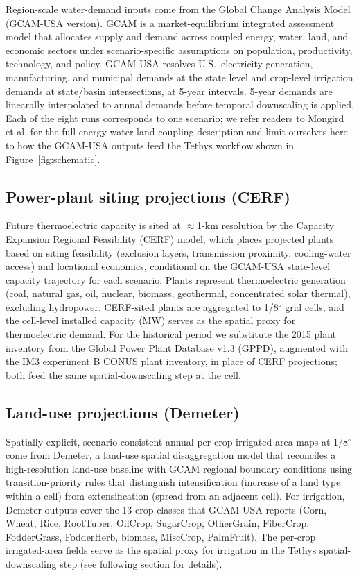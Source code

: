 \documentclass[fleqn,10pt]{wlscirep}
\begin{document}
Region-scale water-demand inputs come from the Global Change Analysis Model (GCAM-USA version)\cite{Zhao_gcamusa_water,Zhao2024,Calvin2019GCAM,Binsted_2022}. GCAM is a market-equilibrium integrated assessment model that allocates supply and demand across coupled energy, water, land, and economic sectors under scenario-specific assumptions on population, productivity, technology, and policy. GCAM-USA resolves U.S.\ electricity generation, manufacturing, and municipal demands at the state level and crop-level irrigation demands at state/basin intersections, at 5-year intervals. 5-year demands are linearally interpolated to annual demands before temporal downscaling is applied. Each of the eight runs corresponds to one scenario; we refer readers to Mongird et al.\cite{Mongird2025CERF} for the full energy-water-land coupling description and limit ourselves here to how the GCAM-USA outputs feed the Tethys workflow shown in Figure~\ref{fig:schematic}.

\subsection*{Power-plant siting projections (CERF)}

Future thermoelectric capacity is sited at $\approx$1-km resolution by the Capacity Expansion Regional Feasibility (CERF) model\cite{Vernon2021,Mongird2025CERF}, which places projected plants based on siting feasibility (exclusion layers, transmission proximity, cooling-water access) and locational economics, conditional on the GCAM-USA state-level capacity trajectory for each scenario. Plants represent thermoelectric generation (coal, natural gas, oil, nuclear, biomass, geothermal, concentrated solar thermal), excluding hydropower. CERF-sited plants are aggregated to 1/8$^{\circ}$ grid cells, and the cell-level installed capacity (MW) serves as the spatial proxy for thermoelectric demand. For the historical period we substitute the 2015 plant inventory from the Global Power Plant Database v1.3 (GPPD), augmented with the IM3 experiment B CONUS plant inventory, in place of CERF projections; both feed the same spatial-downscaling step at the cell.

\subsection*{Land-use projections (Demeter)}

Spatially explicit, scenario-consistent annual per-crop irrigated-area maps at 1/8$^{\circ}$ come from Demeter\cite{Vernon-2018}, a land-use spatial disaggregation model that reconciles a high-resolution land-use baseline with GCAM regional boundary conditions using transition-priority rules that distinguish intensification (increase of a land type within a cell) from extensification (spread from an adjacent cell). For irrigation, Demeter outputs cover the 13 crop classes that GCAM-USA reports (Corn, Wheat, Rice, RootTuber, OilCrop, SugarCrop, OtherGrain, FiberCrop, FodderGrass, FodderHerb, biomass, MiscCrop, PalmFruit). The per-crop irrigated-area fields serve as the spatial proxy for irrigation in the Tethys spatial-downscaling step (see following section for details).
\end{document}
